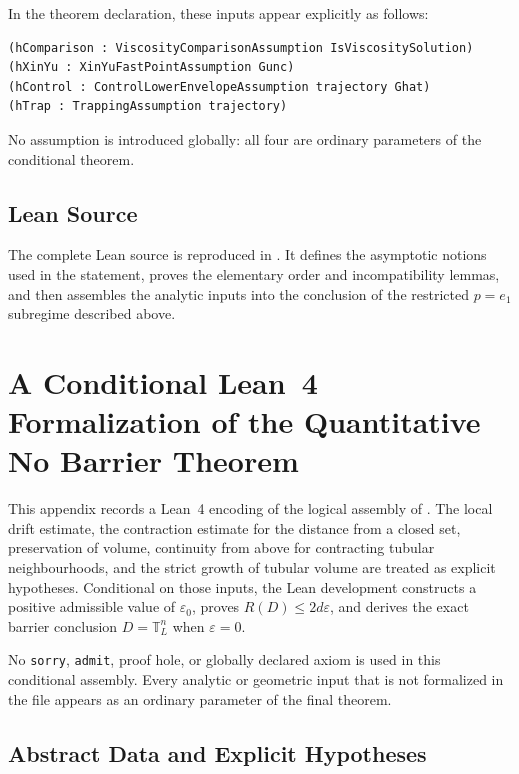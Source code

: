 \documentclass[11pt,reqno,noamsfonts]{amsart}
\theoremstyle{definition}
\theoremstyle{remark}
\newcommand{\T}{\mathbb T}
\begin{document}
In the theorem declaration, these inputs appear explicitly as follows:
\begin{lstlisting}[style=lean4style,numbers=none]
(hComparison : ViscosityComparisonAssumption IsViscositySolution)
(hXinYu : XinYuFastPointAssumption Gunc)
(hControl : ControlLowerEnvelopeAssumption trajectory Ghat)
(hTrap : TrappingAssumption trajectory)
\end{lstlisting}
No assumption is introduced globally: all four are ordinary parameters
of the conditional theorem.
 
\subsection{Lean Source}

The complete Lean source is reproduced in
. It defines the asymptotic notions used
in the statement, proves the elementary order and incompatibility
lemmas, and then assembles the analytic inputs into the conclusion of the
restricted $p=e_1$ subregime described above.




\section{A Conditional Lean~4 Formalization of the
Quantitative No Barrier Theorem}
\label{app:lean-no-barrier-formalization}

This appendix records a Lean~4 encoding of the logical assembly of
. The local drift estimate, the contraction estimate
for the distance from a closed set, preservation of volume, continuity from
above for contracting tubular neighbourhoods, and the strict growth of
tubular volume are treated as explicit hypotheses. Conditional on those
inputs, the Lean development constructs a positive admissible value of
$\varepsilon_0$, proves
  $R(D)\le 2d\varepsilon$, 
and derives the exact barrier conclusion $D=\T_L^n$ when
$\varepsilon=0$.

No \texttt{sorry}, \texttt{admit}, proof hole, or globally declared axiom is
used in this conditional assembly. Every analytic or geometric input that is
not formalized in the file appears as an ordinary parameter of the final
theorem.

\subsection{Abstract Data and Explicit Hypotheses}
\end{document}
